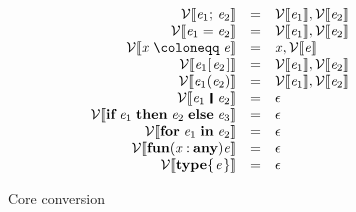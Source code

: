 \documentclass[acmsmall,screen]{acmart}\settopmatter{}
\newcommand{\Varid}[1]{\mathit{#1}}
\newcommand{\Vr}[1]{{\mathcal V}\llbracket #1 \rrbracket}
\newenvironment{figurebox}{\begin{figure}\begin{framed}}{\end{framed}\end{figure}}
\begin{document}
\begin{figurebox}
$$\begin{array}{rcll}
    \ensuremath{\Vr{ \Varid{e}_{\mathrm{1}};\,\Varid{e}_{\mathrm{2}}}} & = & \ensuremath{\Vr{ \Varid{e}_{\mathrm{1}}},\Vr{ \Varid{e}_{\mathrm{2}}}} \\
    \ensuremath{\Vr{ \Varid{e}_{\mathrm{1}}\mathrel{=}\Varid{e}_{\mathrm{2}}}} & = & \ensuremath{\Vr{ \Varid{e}_{\mathrm{1}}},\Vr{ \Varid{e}_{\mathrm{2}}}} \\
    \ensuremath{\Vr{ \Varid{x}\mathrel{\coloneqq}\Varid{e}}} & = & \ensuremath{\Varid{x},\Vr{ \Varid{e}}} \\
    \ensuremath{\Vr{ \Varid{e}_{\mathrm{1}} [\mskip1.5mu \Varid{e}_{\mathrm{2}}\mskip1.5mu]}} & = & \ensuremath{\Vr{ \Varid{e}_{\mathrm{1}}},\Vr{ \Varid{e}_{\mathrm{2}}}} \\
    \ensuremath{\Vr{ \Varid{e}_{\mathrm{1}} (\Varid{e}_{\mathrm{2}})}} & = & \ensuremath{\Vr{ \Varid{e}_{\mathrm{1}}},\Vr{ \Varid{e}_{\mathrm{2}}}} \\
    \ensuremath{\Vr{ \Varid{e}_{\mathrm{1}}\hspace{0.2em}\mathop{\rule[-0.1em]{0.15em}{0.75em}}\hspace{0.2em}\Varid{e}_{\mathrm{2}}}} & = & \ensuremath{\epsilon} \\
    \ensuremath{\Vr{ \textbf{if}\;\Varid{e}_{\mathrm{1}}\;\textbf{then}\;\Varid{e}_{\mathrm{2}}\;\textbf{else}\;\Varid{e}_{\mathrm{3}}}} & = & \ensuremath{\epsilon} \\
    \ensuremath{\Vr{ \textbf{for}\;\Varid{e}_{\mathrm{1}}\;\textbf{in}\;\Varid{e}_{\mathrm{2}}}} & = & \ensuremath{\epsilon} \\
    \ensuremath{\Vr{ \textbf{fun}(\Varid{x}\mathbin{:}\textbf{any})\Varid{e}}} & = & \ensuremath{\epsilon} \\
    \ensuremath{\Vr{ \textbf{type} \{\mskip1.5mu \Varid{e}\mskip1.5mu\}}} & = & \ensuremath{\epsilon} \\
  \end{array}
  $$
\caption{Core conversion} \label{fig:core-conversion}
\end{figurebox}
\end{document}

